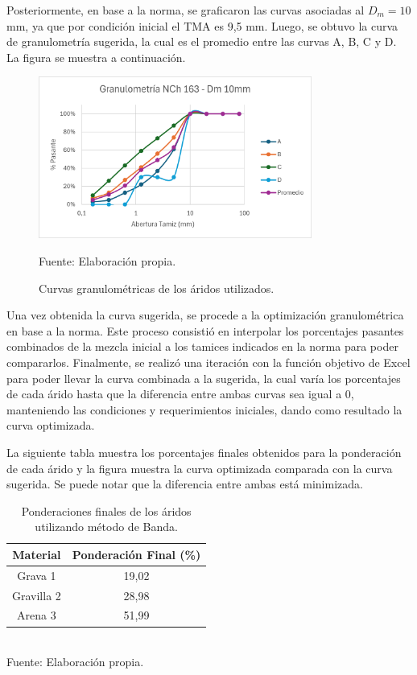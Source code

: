 Posteriormente, en base a la norma, se graficaron las curvas asociadas al $D_m = 10$ mm, ya que por condición inicial el TMA es 9,5 mm. Luego, se obtuvo la curva de granulometría sugerida, la cual es el promedio entre las curvas A, B, C y D. La figura se muestra a continuación.

\begin{figure}[H]
    \centering
    \includegraphics[width=0.8\textwidth]{GRAFICOS/NCh163.png}
    \caption{Curvas granulométricas de los áridos utilizados.}
    Fuente: Elaboración propia.
\end{figure}

Una vez obtenida la curva sugerida, se procede a la optimización granulométrica en base a la norma. Este proceso consistió en interpolar los porcentajes pasantes combinados de la mezcla inicial a los tamices indicados en la norma para poder compararlos. Finalmente, se realizó una iteración con la función objetivo de Excel para poder llevar la curva combinada a la sugerida, la cual varía los porcentajes de cada árido hasta que la diferencia entre ambas curvas sea igual a 0, manteniendo las condiciones y requerimientos iniciales, dando como resultado la curva optimizada.

La siguiente tabla muestra los porcentajes finales obtenidos para la ponderación de cada árido y la figura muestra la curva optimizada comparada con la curva sugerida. Se puede notar que la diferencia entre ambas está minimizada.

\begin{table}[H]
\centering
\caption{Ponderaciones finales de los áridos utilizando método de Banda.}
\begin{tabular}{|c|c|}
\hline
\textbf{Material} & \textbf{Ponderación Final (\%)} \\ \hline
Grava 1 & 19,02 \\ \hline
Gravilla 2 & 28,98 \\ \hline
Arena 3 & 51,99 \\ \hline
\end{tabular}
\\Fuente: Elaboración propia.
\end{table}

